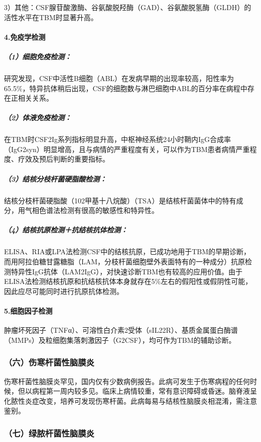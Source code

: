 3）其他：CSF腺苷酸激酶、谷氨酸脱羟酶（GAD）、谷氨酸脱氢酶（GLDH）的活性水平在TBM时显著升高。

\paragraph{4.免疫学检测}

\subparagraph{（1）细胞免疫检测：}

研究发现，CSF中活性B细胞（ABL）在发病早期的出现率较高，阳性率为65.5\%，特异抗体稍后出现，CSF的细胞数与淋巴细胞中ABL的百分率在病程中存在正相关关系。

\subparagraph{（2）体液免疫检测：}

在TBM时CSF2Ig系列指标明显升高，中枢神经系统24小时鞘内IgG合成率（IgG2syn）明显增高，且与病情的严重程度有关，可以作为TBM患者病情严重程度、疗效及预后判断的重要指标。

\subparagraph{（3）结核分枝杆菌硬脂酸检测：}

结核分枝杆菌硬脂酸（102甲基十八烷酸）（TSA）是结核杆菌菌体中的特有成分，用气相色谱法检测有很高的敏感性和特异性。

\subparagraph{（4）结核抗原检测＋抗结核抗体检测：}

ELISA、RIA或LPA法检测CSF中的结核抗原，已成功地用于TBM的早期诊断，而用阿拉伯糖甘露糖脂（LAM，分枝杆菌细胞壁外表面特有的一种成分）抗原检测特异性IgG抗体（LAM2IgG），对快速诊断TBM也有较高的应用价值。由于ELISA法检测结核抗原和抗结核抗体本身就存在5\%左右的假阳性或假阴性可能，因此应尽可能同时进行抗原抗体检测。

\paragraph{5.细胞因子检测}

肿瘤坏死因子（TNFα）、可溶性白介素2受体（sIL22R）、基质金属蛋白酶谱（MMPs）及粒细胞集落刺激因子（G2CSF），均可作为TBM的辅助诊断。

\subsubsection{（六）伤寒杆菌性脑膜炎}

伤寒杆菌性脑膜炎罕见，国内仅有少数病例报告。此病可发生于伤寒病程的任何时候，但以病程第一周内较多见。临床上病情较重，常有意识障碍或昏迷。脑脊液呈化脓性炎症改变，培养可发现伤寒杆菌。此病每易与结核性脑膜炎相混淆，需注意鉴别。

\subsubsection{（七）绿脓杆菌性脑膜炎}

